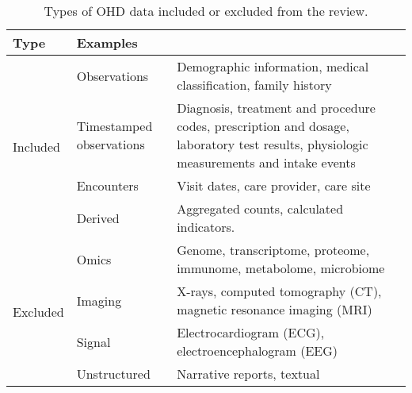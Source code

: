 \begin{table}[htp]
\center
\footnotesize
  \caption{Types of OHD data included or excluded from the review.}\label{tab:datatypes}
  
  \begin{tabularx}{\textwidth}{@{} p{}Xp{}@{}}\toprule
  Type & Examples \\ \midrule
  
  \multirow{4}{*}{Included} & Observations & Demographic information, medical classification, family history \\
  
  &Timestamped observations & Diagnosis, treatment and procedure codes, prescription and dosage, laboratory test results, physiologic measurements and intake events \\
  &Encounters & Visit dates, care provider, care site \\
  &Derived & Aggregated counts, calculated indicators. \\ \midrule

  \multirow{4}{*}{Excluded} &Omics & Genome, transcriptome, proteome, immunome, metabolome, microbiome \\
  &Imaging & X-rays, computed tomography (CT), magnetic resonance imaging (MRI) \\
  &Signal & Electrocardiogram (ECG), electroencephalogram (EEG) \\
  &Unstructured & Narrative reports, textual \\ \bottomrule
  \end{tabularx}%
\end{table}